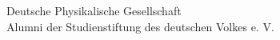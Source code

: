 



  \begin{small} \color{black}
  Deutsche Physikalische Gesellschaft \\
  Alumni der Studienstiftung des deutschen Volkes e. V. \\
  \end{small}



